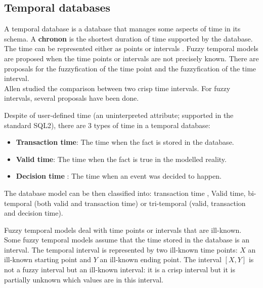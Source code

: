\subsection{Temporal databases}
A temporal database \cite{Dyreson1994} is a database that manages some aspects of time in its schema. A \textbf{chronon} is the shortest duration of time supported by the database. The time can be represented either as points or intervals \cite{655777}. Fuzzy temporal models \cite{schockaert08} are proposed when the time points or intervals are not precisely known. There are proposals for the  fuzzyfication of the time point and the fuzzyfication of the time interval.\\
Allen \cite{Allen83} studied the comparison between two crisp time intervals. For fuzzy intervals, several proposals \cite{ohlbach04,nagypal03,schockaert08} have been done.




Despite of user-defined time (an uninterpreted attribute; supported in the standard SQL2), there are 3 types of time in a temporal database:

\begin{itemize}
	\item
	\textbf{Transaction time}: The time when the fact is stored in the database.
	\item
	\textbf{Valid time}: The time when the fact is true in the modelled reality.
	\item
	\textbf{Decision time} \cite{Nascimento95}: The time when an event was decided to happen. 
	\end{itemize}
	
	 The  database model can be then classified into: transaction time \cite{Jensen91}, Valid time, bi-temporal \cite{Snodgrass84}(both valid and transaction time) or tri-temporal \cite{Nascimento95} (valid, transaction and decision time).

Fuzzy temporal models \cite{schockaert08} deal with time points \cite{Dubois89} or intervals \cite{Garrido2009} that are ill-known. Some fuzzy temporal models assume that the time stored in the database is an interval. The temporal interval is represented by two ill-known time points: $X$  an ill-known starting point and $Y$ an ill-known ending point. The interval $\left[X,Y\right]$ is not a fuzzy interval but an ill-known interval: it is a crisp interval but it is partially unknown which values are in this interval.
